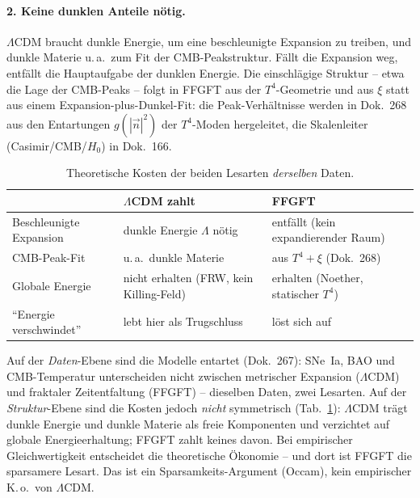 \paragraph{2. Keine dunklen Anteile nötig.}
$\Lambda$CDM braucht dunkle Energie, um eine beschleunigte Expansion zu treiben,
und dunkle Materie u.\,a.\ zum Fit der CMB-Peakstruktur. Fällt die Expansion
weg, entfällt die Hauptaufgabe der dunklen Energie. Die einschlägige Struktur --
etwa die Lage der CMB-Peaks -- folgt in FFGFT aus der $T^4$-Geometrie und aus
$\xi$ statt aus einem Expansion-plus-Dunkel-Fit: die Peak-Verhältnisse werden
in Dok.~268 aus den Entartungen $g(|\vec n|^2)$ der $T^4$-Moden hergeleitet,
die Skalenleiter (Casimir/CMB/$H_0$) in Dok.~166.

\begin{table}[ht]
\centering
\caption{Theoretische Kosten der beiden Lesarten \emph{derselben} Daten.}
\label{tab:kosten277}
\begin{tabular}{@{}lll@{}}
\toprule
 & $\Lambda$CDM zahlt & FFGFT \\
\midrule
Beschleunigte Expansion & dunkle Energie $\Lambda$ nötig &
  entfällt (kein expandierender Raum) \\
CMB-Peak-Fit & u.\,a.\ dunkle Materie &
  aus $T^4+\xi$ (Dok.~268) \\
Globale Energie & nicht erhalten (FRW, kein Killing-Feld) &
  erhalten (Noether, statischer $T^4$) \\
\enquote{Energie verschwindet} & lebt hier als Trugschluss &
  löst sich auf \\
\bottomrule
\end{tabular}
\end{table}

\begin{warnung}\label{warn:entartung277}
Auf der \emph{Daten}-Ebene sind die Modelle entartet (Dok.~267): SNe~Ia, BAO und
CMB-Temperatur unterscheiden nicht zwischen metrischer Expansion ($\Lambda$CDM)
und fraktaler Zeitentfaltung (FFGFT) -- dieselben Daten, zwei Lesarten. Auf der
\emph{Struktur}-Ebene sind die Kosten jedoch \emph{nicht} symmetrisch
(Tab.~\ref{tab:kosten277}): $\Lambda$CDM trägt dunkle Energie und dunkle Materie
als freie Komponenten und verzichtet auf globale Energieerhaltung; FFGFT zahlt
keines davon. Bei empirischer Gleichwertigkeit entscheidet die theoretische
Ökonomie -- und dort ist FFGFT die sparsamere Lesart. Das ist ein
Sparsamkeits-Argument (Occam), kein empirischer K.\,o.\ von $\Lambda$CDM.
\end{warnung}

